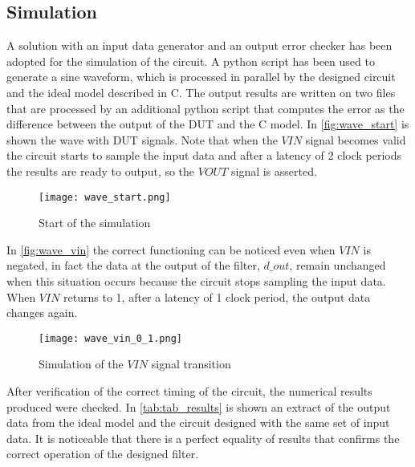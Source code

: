 \subsection{Simulation}
A solution with an input data generator and an output error checker has been adopted for the simulation of the circuit. A python script has been used to generate a sine waveform, which is processed in parallel by the designed circuit and the ideal model described in C. The output results are written on two files that are processed by an additional python script that computes the error as the difference between the output of the DUT and the C model.
In \autoref{fig:wave_start} is shown the wave with DUT signals. Note that when the $VIN$ signal becomes valid the circuit starts to sample the input data and after a latency of 2 clock periods the results are ready to output, so the $VOUT$ signal is asserted.

\begin{figure}[h]
	\center
	\texttt{[image: wave\_start.png]}
	\caption{Start of the simulation}
	\label{fig:wave_start}
\end{figure}

In \autoref{fig:wave_vin} the correct functioning can be noticed even when $VIN$ is negated, in fact the data at the output of the filter, $d\_out$, remain unchanged when this situation occurs because the circuit stops sampling the input data. When $VIN$ returns to 1, after a latency of 1 clock period, the output data changes again.

\begin{figure}[h]
	\center
	\texttt{[image: wave\_vin\_0\_1.png]}
	\caption{Simulation of the $VIN$ signal transition}
	\label{fig:wave_vin}
\end{figure}

After verification of the correct timing of the circuit, the numerical results produced were checked. In \autoref{tab:tab_results} is shown an extract of the output data from the ideal model and the circuit designed with the same set of input data. It is noticeable that there is a perfect equality of results that confirms the correct operation of the designed filter.


